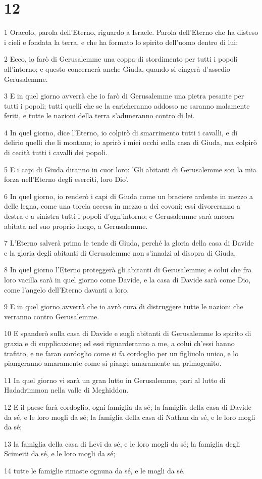 \chapter{12}

\par 1 Oracolo, parola dell'Eterno, riguardo a Israele. Parola dell'Eterno che ha disteso i cieli e fondata la terra, e che ha formato lo spirito dell'uomo dentro di lui:
\par 2 Ecco, io farò di Gerusalemme una coppa di stordimento per tutti i popoli all'intorno; e questo concernerà anche Giuda, quando si cingerà d'assedio Gerusalemme.
\par 3 E in quel giorno avverrà che io farò di Gerusalemme una pietra pesante per tutti i popoli; tutti quelli che se la caricheranno addosso ne saranno malamente feriti, e tutte le nazioni della terra s'aduneranno contro di lei.
\par 4 In quel giorno, dice l'Eterno, io colpirò di smarrimento tutti i cavalli, e di delirio quelli che li montano; io aprirò i miei occhi sulla casa di Giuda, ma colpirò di cecità tutti i cavalli dei popoli.
\par 5 E i capi di Giuda diranno in cuor loro: 'Gli abitanti di Gerusalemme son la mia forza nell'Eterno degli eserciti, loro Dio'.
\par 6 In quel giorno, io renderò i capi di Giuda come un braciere ardente in mezzo a delle legna, come una torcia accesa in mezzo a dei covoni; essi divoreranno a destra e a sinistra tutti i popoli d'ogn'intorno; e Gerusalemme sarà ancora abitata nel suo proprio luogo, a Gerusalemme.
\par 7 L'Eterno salverà prima le tende di Giuda, perché la gloria della casa di Davide e la gloria degli abitanti di Gerusalemme non s'innalzi al disopra di Giuda.
\par 8 In quel giorno l'Eterno proteggerà gli abitanti di Gerusalemme; e colui che fra loro vacilla sarà in quel giorno come Davide, e la casa di Davide sarà come Dio, come l'angelo dell'Eterno davanti a loro.
\par 9 E in quel giorno avverrà che io avrò cura di distruggere tutte le nazioni che verranno contro Gerusalemme.
\par 10 E spanderò sulla casa di Davide e sugli abitanti di Gerusalemme lo spirito di grazia e di supplicazione; ed essi riguarderanno a me, a colui ch'essi hanno trafitto, e ne faran cordoglio come si fa cordoglio per un figliuolo unico, e lo piangeranno amaramente come si piange amaramente un primogenito.
\par 11 In quel giorno vi sarà un gran lutto in Gerusalemme, pari al lutto di Hadadrimmon nella valle di Meghiddon.
\par 12 E il paese farà cordoglio, ogni famiglia da sé; la famiglia della casa di Davide da sé, e le loro mogli da sé; la famiglia della casa di Nathan da sé, e le loro mogli da sé;
\par 13 la famiglia della casa di Levi da sé, e le loro mogli da sé; la famiglia degli Scimeiti da sé, e le loro mogli da sé;
\par 14 tutte le famiglie rimaste ognuna da sé, e le mogli da sé.

